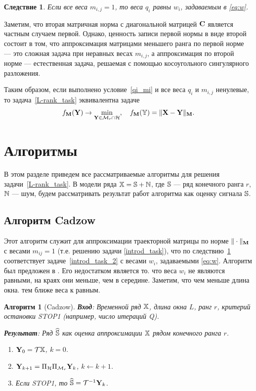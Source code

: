 \documentclass[12pt,a4paper,fleqn,leqno]{article}
\newtheorem{corollary}{Следствие}%
\newtheorem{algorithm}{Алгоритм}%
\begin{document}
\begin{corollary}
\label{cor:base_weights}
Если все веса $m_{i,j}=1$, то веса $q_i$ равны $w_i$, задаваемым в \eqref{eq:w}.
\end{corollary}

Заметим, что вторая матричная норма с диагональной матрицей $\mathbf{C}$ является частным случаем первой.
Однако, ценность записи первой нормы в виде
второй состоит в том, что аппроксимация матрицами меньшего ранга по первой норме --- это сложная задача при неравных весах
$m_{i,j}$, а аппроксимация по второй норме --- естественная задача, решаемая с помощью косоугольного сингулярного разложения.

\begin{remark}
Таким образом, если выполнено условие~\eqref{qi_mi} и все веса $q_i$ и $m_{i,j}$ ненулевые, то задача~\eqref{L-rank_task}
эквивалентна задаче 
\begin{equation} 
\label{rank_task}
    f_{\mathbf{M}}(\mathbf{Y}) \to \min_{\mathbf{Y} \in \mathcal{M}_r \cap \mathcal{H}}, \quad f_{\mathbf{M}}(\mathbb{Y}) = \|\mathbf{X}-\mathbf{Y}\|_{\mathbf{M}}.
\end{equation}
\end{remark}

\section{Алгоритмы}
\label{sec:alg}
В этом разделе приведем все рассматриваемые алгоритмы для решения задачи~\eqref{L-rank_task}.
В модели ряда $\mathbb{X}=\mathbb{S}+\mathbb{N}$, где $\mathbb{S}$ --- ряд конечного ранга $r$, $\mathbb{N}$ --- шум, будем рассматривать
результат работ алгоритма как оценку сигнала $\mathbb{S}$.

\subsection{Алгоритм Cadzow}
Этот алгоритм служит для аппроксимации траекторной матрицы по норме $\|\cdot\|_{\mathbf{M}}$ с весами $m_{ij}=1$ (т.е. решению задачи \eqref{introd_task}), что по следствию~\ref{cor:base_weights} соответствует задаче~\eqref{introd_task_2} с весами $w_i$, задаваемыми \eqref{eq:w}.
Алгоритм был предложен в \cite{Cadzow1988}. Его недостатком является то. что веса $w_i$ не являются равными,
на краях они меньше, чем в середине. Заметим, что чем меньше длина окна. тем ближе веса к равным.

\begin{algorithm}[Cadzow]
\textbf{Вход}: Временной ряд $\mathbb{X}$, длина окна $L$, ранг $r$,
критерий остановки STOP1 (например, число итераций Q).

\textbf{Результат}:
Ряд $\widehat{\mathbb{S}}$ как оценка аппроксимации $\mathbb{X}$ рядом конечного ранга $r$.

\begin{enumerate}
\item
$\mathbf{Y}_0 = \mathcal{T} \mathbb{X}$, $k=0$.
\item
$\mathbf{Y}_{k+1} = \Pi_{\mathcal{H}}  \Pi_{\mathcal{M}_r} \mathbf{Y}_{k}$, $k\leftarrow k+1$.
\item
Если STOP1, то $\widehat{\mathbb{S}} = \mathcal{T}^{-1} \mathbf{Y}_k$.
\end{enumerate}
\end{algorithm}
\end{document}
